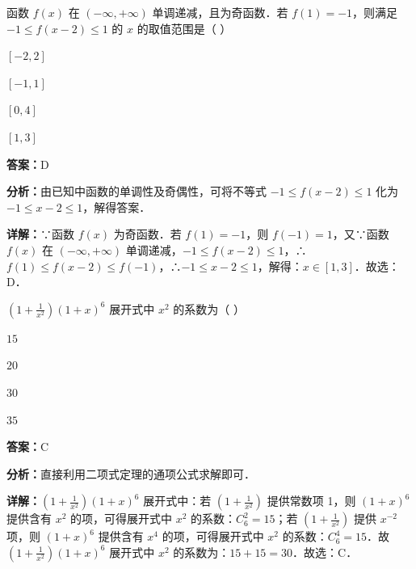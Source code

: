 \begin{question}[points=5]
函数 $f(x)$ 在 $(-\infty,+\infty)$ 单调递减，且为奇函数．若 $f(1)=-1$，则满足 $-1\leq f(x-2)\leq 1$ 的 $x$ 的取值范围是（ ）
\begin{choices}
  \item $[-2,2]$
  \item $[-1,1]$
  \item $[0,4]$
  \item $[1,3]$
\end{choices}
\begin{solution}
\textbf{答案：}D

\textbf{分析：}由已知中函数的单调性及奇偶性，可将不等式 $-1\leq f(x-2)\leq 1$ 化为 $-1\leq x-2\leq 1$，解得答案．

\textbf{详解：}∵函数 $f(x)$ 为奇函数．若 $f(1)=-1$，则 $f(-1)=1$，又∵函数 $f(x)$ 在 $(-\infty,+\infty)$ 单调递减，$-1\leq f(x-2)\leq 1$，∴$f(1)\leq f(x-2)\leq f(-1)$，∴$-1\leq x-2\leq 1$，解得：$x\in[1,3]$．故选：D．
\end{solution}
\end{question}

\begin{question}[points=5]
$(1+\frac{1}{x^2})(1+x)^6$ 展开式中 $x^2$ 的系数为（ ）
\begin{choices}
  \item $15$
  \item $20$
  \item $30$
  \item $35$
\end{choices}
\begin{solution}
\textbf{答案：}C

\textbf{分析：}直接利用二项式定理的通项公式求解即可．

\textbf{详解：}$(1+\frac{1}{x^2})(1+x)^6$ 展开式中：若 $(1+\frac{1}{x^2})$ 提供常数项 1，则 $(1+x)^6$ 提供含有 $x^2$ 的项，可得展开式中 $x^2$ 的系数：$C_6^2=15$；若 $(1+\frac{1}{x^2})$ 提供 $x^{-2}$ 项，则 $(1+x)^6$ 提供含有 $x^4$ 的项，可得展开式中 $x^2$ 的系数：$C_6^4=15$．故 $(1+\frac{1}{x^2})(1+x)^6$ 展开式中 $x^2$ 的系数为：$15+15=30$．故选：C．
\end{solution}
\end{question}

